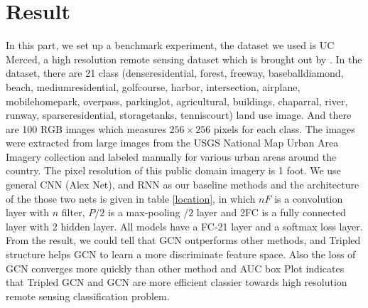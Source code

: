 \documentclass[11pt]{article}
\begin{document}
\section{Result}
In this part, we set up a benchmark experiment, the dataset we used is UC Merced, a high resolution remote sensing dataset which is brought out by \cite{Chaudhuri2018Multilabel}. In the dataset, there are 21 class (denseresidential, forest, freeway, baseballdiamond, beach, mediumresidential, golfcourse, harbor, intersection,  airplane, mobilehomepark, overpass, parkinglot, agricultural, buildings, chaparral, river, runway, sparseresidential, storagetanks, tenniscourt) land use image. And there are 100 RGB images which measures $256\times 256$ pixels for each class. The images were extracted from large images from the USGS National Map Urban Area Imagery collection and labeled manually for various urban areas around the country. The pixel resolution of this public domain imagery is 1 foot. We use general CNN (Alex Net), and RNN as our baseline methods and the architecture of the those two nets is given in table \ref{location}, in which $nF$ is a convolution layer with $n$ filter, $P/2$ is a max-pooling $/2$ layer and 2FC is a fully connected layer with 2 hidden layer. All models have a FC-21 layer and a softmax loss layer. From the result, we could tell that GCN outperforms other methods, and Tripled structure helps GCN to learn a more discriminate feature space. Also the loss of GCN converges more quickly than other method and AUC box Plot indicates that Tripled GCN and GCN are more efficient classier towards high resolution remote sensing classification problem.
\end{document}
